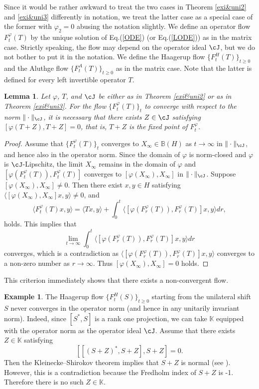 \documentclass[12pt]{article}
\newtheorem{lemma}[theorem]{Lemma}
\theoremstyle{definition}
\newtheorem{example}[theorem]{Example}
\numberwithin{equation}{section}
\newcommand{\B}{\mathbb{B}}
\newcommand{\K}{\mathbb{K}}
\newcommand{\inpr}[2]{\langle{#1,#2}\rangle}
\begin{document}
Since it would be rather awkward to treat the two cases in Theorem \ref{exi&uni2} and \ref{exi&uni3} differently in notation, 
we treat the latter case as a special case of the former with $\varphi_2=0$ abusing the notation slightly.   
We define an operator flow $F^\varphi_t(T)$ by the unique solution of Eq.(\ref{ODE}) (or Eq.(\ref{LODE})) as in the matrix case. 
Strictly speaking, the flow may depend on the operator ideal $\cJ$, but we do not bother to put it in the notation. 
We define the Haagerup flow $\{F^H_t(T)\}_{t\geq 0}$ and the Aluthge flow $\{F^A_t(T)\}_{t\geq 0}$ 
as in the matrix case. 
Note that the latter is defined for every left invertible operator $T$. 

\begin{lemma}\label{necessary} Let $\varphi$, $T$, and $\cJ$ be either as in Theorem \ref{exi&uni2} or as in Theorem \ref{exi&uni3}. 
For the flow $\{F^\varphi_t(T)\}_t$ to converge with respect to the norm $\|\cdot \|_\cJ$, it is necessary that 
there exists $Z\in \cJ$ satisfying $[\varphi(T+Z),T+Z]=0$, that is, $T+Z$ is the fixed point of $F^\varphi_t$. 
\end{lemma}

\begin{proof}
Assume that $\{F^\varphi_t(T)\}_t$ converges to $X_\infty\in \B(H)$ as $t \to \infty$ in $\|\cdot\|_\cJ$, 
and hence also in the operator norm. 
Since the domain of $\varphi$ is norm-closed and $\varphi$ is $\cJ$-Lipschitz, the limit $X_\infty$ remains in the domain of 
$\varphi$ and $[\varphi(F^\varphi_t(T)),F^\varphi_t(T)]$ converges to $[\varphi(X_\infty),X_\infty]$ in $\|\cdot\|_\cJ$. 
Suppose $[\varphi(X_\infty),X_\infty]\neq 0$. 
Then there exist $x,y\in H$ satisfying $\inpr{[\varphi(X_\infty),X_\infty]x}{y}\neq 0$, and 
\[\inpr{F^\varphi_t(T)x}{y}=\inpr{Tx}{y}+\int_0^t \inpr{[\varphi(F^\varphi_r(T)),F^\varphi_r(T)]x}{y}dr,\]
holds. 
This implies that
\[\lim_{t\to\infty}\int_0^t \inpr{[\varphi(F^\varphi_r(T)),F^\varphi_r(T)]x}{y}dr\]
converges, which is a contradiction as $\inpr{[\varphi(F^\varphi_r(T)),F^\varphi_r(T)]x}{y}$ converges to a 
non-zero number as $r\to\infty$. 
Thus $[\varphi(X_\infty),X_\infty]=0$ holds. 
\end{proof}

This criterion immediately shows that there exists a non-convergent flow.   

\begin{example}\label{Haagerupshift}
The Haagerup flow $\{F^H_t(S)\}_{t\geq 0}$ starting from the unilateral shift $S$ never converges 
in the operator norm (and hence in any unitarily invariant norm). 
Indeed, since $[S^*,S]$ is a rank one projection, we can take $\K$ equipped with the operator norm as 
the operator ideal $\cJ$. 
Assume that there exists $Z\in \K$ satisfying 
\[ [[(S+Z)^*,S+Z],S+Z]=0.\] 
Then the Kleinecke--Shirokov theorem implies that $S+Z$ is normal (see \cite[Problem 232]{Hal1982}). 
However, this is a contradiction because the Fredholm index of $S+Z$ is -1. 
Therefore there is no such $Z\in \K$.  
\end{example}
\end{document}
